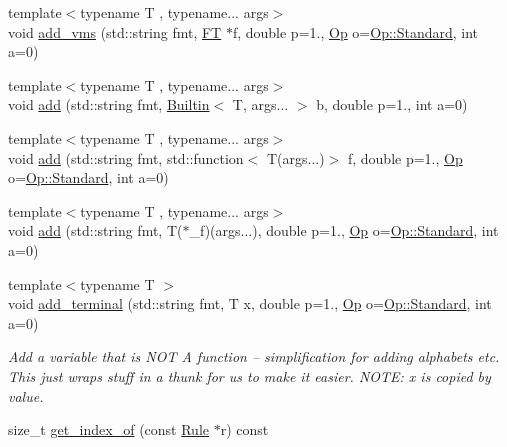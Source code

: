 \begin{DoxyCompactItemize}
\item 
{\footnotesize template$<$typename T , typename... args$>$ }\\void \hyperlink{class_grammar_af6325e79ee8789f3fe851927f7354d91}{add\+\_\+vms} (std\+::string fmt, \hyperlink{class_grammar_af9b9935f4da29e68087b25ef75f22564}{FT} $\ast$f, double p=1., \hyperlink{_ops_8h_a588e6b56097e045c733b60d25c4d45ab}{Op} o=\hyperlink{_ops_8h_a588e6b56097e045c733b60d25c4d45abaeb6d8ae6f20283755b339c0dc273988b}{Op\+::\+Standard}, int a=0)
\item 
{\footnotesize template$<$typename T , typename... args$>$ }\\void \hyperlink{class_grammar_a07ae62095abaf00b3da2fc5065c941bf}{add} (std\+::string fmt, \hyperlink{struct_builtin}{Builtin}$<$ T, args... $>$ b, double p=1., int a=0)
\item 
{\footnotesize template$<$typename T , typename... args$>$ }\\void \hyperlink{class_grammar_a633cc234bdf39f7a875bbb4691ba9470}{add} (std\+::string fmt, std\+::function$<$ T(args...)$>$ f, double p=1., \hyperlink{_ops_8h_a588e6b56097e045c733b60d25c4d45ab}{Op} o=\hyperlink{_ops_8h_a588e6b56097e045c733b60d25c4d45abaeb6d8ae6f20283755b339c0dc273988b}{Op\+::\+Standard}, int a=0)
\item 
{\footnotesize template$<$typename T , typename... args$>$ }\\void \hyperlink{class_grammar_a29eade7ad059e6e976f7a9c5a607e0b6}{add} (std\+::string fmt, T($\ast$\+\_\+f)(args...), double p=1., \hyperlink{_ops_8h_a588e6b56097e045c733b60d25c4d45ab}{Op} o=\hyperlink{_ops_8h_a588e6b56097e045c733b60d25c4d45abaeb6d8ae6f20283755b339c0dc273988b}{Op\+::\+Standard}, int a=0)
\item 
{\footnotesize template$<$typename T $>$ }\\void \hyperlink{class_grammar_af43a4d8c3c2c7df80a916a5219b7232c}{add\+\_\+terminal} (std\+::string fmt, T x, double p=1., \hyperlink{_ops_8h_a588e6b56097e045c733b60d25c4d45ab}{Op} o=\hyperlink{_ops_8h_a588e6b56097e045c733b60d25c4d45abaeb6d8ae6f20283755b339c0dc273988b}{Op\+::\+Standard}, int a=0)
\begin{DoxyCompactList}\small\item\em Add a variable that is N\+OT A function -- simplification for adding alphabets etc. This just wraps stuff in a thunk for us to make it easier. N\+O\+TE\+: x is copied by value. \end{DoxyCompactList}\item 
size\+\_\+t \hyperlink{class_grammar_a4dc14b38ba87cdc516deac5028fa1032}{get\+\_\+index\+\_\+of} (const \hyperlink{class_rule}{Rule} $\ast$r) const

\end{DoxyCompactItemize}
